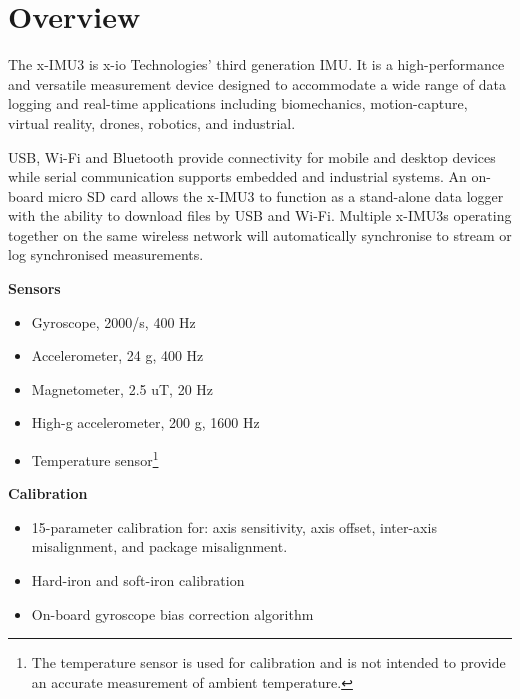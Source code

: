 \section{Overview}

\begin{multicols}{2}

The x-IMU3 is x-io Technologies' third generation \ac{IMU}.  It is a high-performance and versatile measurement device designed to accommodate a wide range of data logging and real-time applications including biomechanics, motion-capture, virtual reality, drones, robotics, and industrial.

\acs{USB}, Wi-Fi and Bluetooth provide connectivity for mobile and desktop devices while serial communication supports embedded and industrial systems.  An on-board micro \acs{SD} card allows the x-IMU3 to function as a stand-alone data logger with the ability to download files by USB and Wi-Fi.  Multiple x-IMU3s operating together on the same wireless network will automatically synchronise to stream or log synchronised measurements.

\textbf{Sensors}
\begin{itemize}[nolistsep]
    \item Gyroscope, \textpm{}2000\textdegree{}/s, 400 Hz
    \item Accelerometer, \textpm{}24 g, 400 Hz
    \item Magnetometer, \textpm{}2.5 uT, 20 Hz
    \item High-g accelerometer, \textpm{}200 g, 1600 Hz
    \item Temperature sensor\footnote{The temperature sensor is used for calibration and is not intended to provide an accurate measurement of ambient temperature.}
\end{itemize}

\textbf{Calibration}
\begin{itemize}[nolistsep]
    \item 15-parameter calibration for: axis sensitivity, axis offset, inter-axis misalignment, and package misalignment.
    \item Hard-iron and soft-iron calibration
    \item On-board gyroscope bias correction algorithm
\end{itemize}


\end{multicols}
